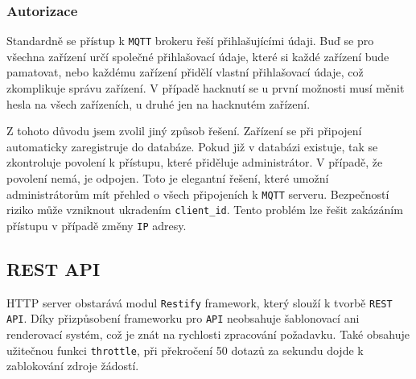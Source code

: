 \documentclass[czech,BP]{thesiskiv}
\begin{document}
			
		
			\subsubsection{Autorizace}
		Standardně se přístup k \texttt{MQTT} brokeru řeší přihlašujícími údaji. 
		Buď se pro všechna zařízení určí společné přihlašovací údaje, které si každé zařízení bude pamatovat, nebo každému zařízení přidělí vlastní přihlašovací údaje, což zkomplikuje správu zařízení.		
 		V případě hacknutí se u první možnosti musí měnit hesla na všech zařízeních, u druhé jen na hacknutém zařízení.
 		
 		Z tohoto důvodu jsem zvolil jiný způsob řešení.
		Zařízení se při připojení automaticky zaregistruje do databáze. Pokud již v databázi existuje, tak se zkontroluje povolení k přístupu, které přiděluje administrátor.
		V případě, že povolení nemá, je odpojen. Toto je elegantní řešení, které umožní administrátorům mít přehled o všech připojeních k \texttt{MQTT} serveru.			
		Bezpečností riziko může vzniknout ukradením \texttt{client\_id}. Tento problém lze řešit zakázáním přístupu v případě změny \texttt{IP} adresy.
		
		
		
		
	
		\subsection{REST API}
		HTTP server obstarává modul \texttt{Restify} framework, který slouží k tvorbě \texttt{REST API}. Díky přizpůsobení frameworku pro \texttt{API} neobsahuje šablonovací ani renderovací systém, což je znát na rychlosti zpracování požadavku.
		Také obsahuje užitečnou funkci \texttt{throttle}, při překročení 50 dotazů za sekundu dojde k zablokování zdroje žádostí.		
		
\end{document}
